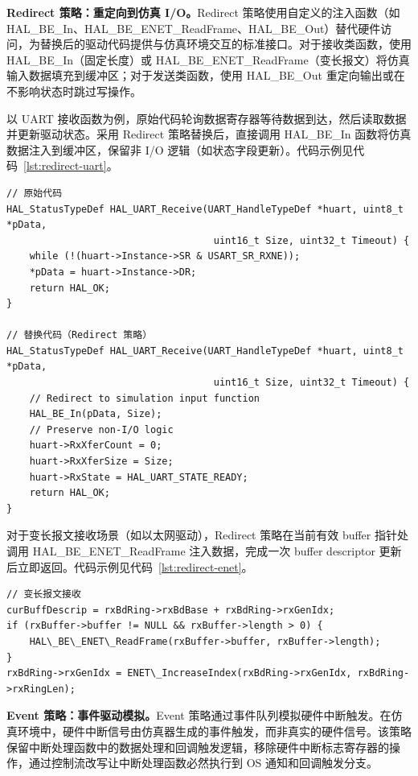 \textbf{Redirect 策略：重定向到仿真 I/O。}Redirect 策略使用自定义的注入函数（如 HAL\_BE\_In、HAL\_BE\_ENET\_ReadFrame、HAL\_BE\_Out）替代硬件访问，为替换后的驱动代码提供与仿真环境交互的标准接口。对于接收类函数，使用 HAL\_BE\_In（固定长度）或 HAL\_BE\_ENET\_ReadFrame（变长报文）将仿真输入数据填充到缓冲区；对于发送类函数，使用 HAL\_BE\_Out 重定向输出或在不影响状态时跳过写操作。

以 UART 接收函数为例，原始代码轮询数据寄存器等待数据到达，然后读取数据并更新驱动状态。采用 Redirect 策略替换后，直接调用 HAL\_BE\_In 函数将仿真数据注入到缓冲区，保留非 I/O 逻辑（如状态字段更新）。代码示例见代码~\ref{lst:redirect-uart}。
\begin{lstlisting}[style=CStyle,abovecaptionskip=0pt,belowcaptionskip=0pt,caption=Redirect 策略替换示例（UART 接收函数）,label=lst:redirect-uart]
// 原始代码
HAL_StatusTypeDef HAL_UART_Receive(UART_HandleTypeDef *huart, uint8_t *pData, 
                                    uint16_t Size, uint32_t Timeout) {
    while (!(huart->Instance->SR & USART_SR_RXNE));
    *pData = huart->Instance->DR;
    return HAL_OK;
}

// 替换代码（Redirect 策略）
HAL_StatusTypeDef HAL_UART_Receive(UART_HandleTypeDef *huart, uint8_t *pData, 
                                    uint16_t Size, uint32_t Timeout) {
    // Redirect to simulation input function
    HAL_BE_In(pData, Size);
    // Preserve non-I/O logic
    huart->RxXferCount = 0;
    huart->RxXferSize = Size;
    huart->RxState = HAL_UART_STATE_READY;
    return HAL_OK;
}
\end{lstlisting}

对于变长报文接收场景（如以太网驱动），Redirect 策略在当前有效 buffer 指针处调用 HAL\_BE\_ENET\_ReadFrame 注入数据，完成一次 buffer descriptor 更新后立即返回。代码示例见代码~\ref{lst:redirect-enet}。

\begin{lstlisting}[style=CStyle,abovecaptionskip=0pt,belowcaptionskip=0pt,caption=Redirect 策略替换示例（变长报文接收）,label=lst:redirect-enet]
// 变长报文接收
curBuffDescrip = rxBdRing->rxBdBase + rxBdRing->rxGenIdx;
if (rxBuffer->buffer != NULL && rxBuffer->length > 0) {
    HAL\_BE\_ENET\_ReadFrame(rxBuffer->buffer, rxBuffer->length);
}
rxBdRing->rxGenIdx = ENET\_IncreaseIndex(rxBdRing->rxGenIdx, rxBdRing->rxRingLen);
\end{lstlisting}    

\textbf{Event 策略：事件驱动模拟。}Event 策略通过事件队列模拟硬件中断触发。在仿真环境中，硬件中断信号由仿真器生成的事件触发，而非真实的硬件信号。该策略保留中断处理函数中的数据处理和回调触发逻辑，移除硬件中断标志寄存器的操作，通过控制流改写让中断处理函数必然执行到 OS 通知和回调触发分支。

